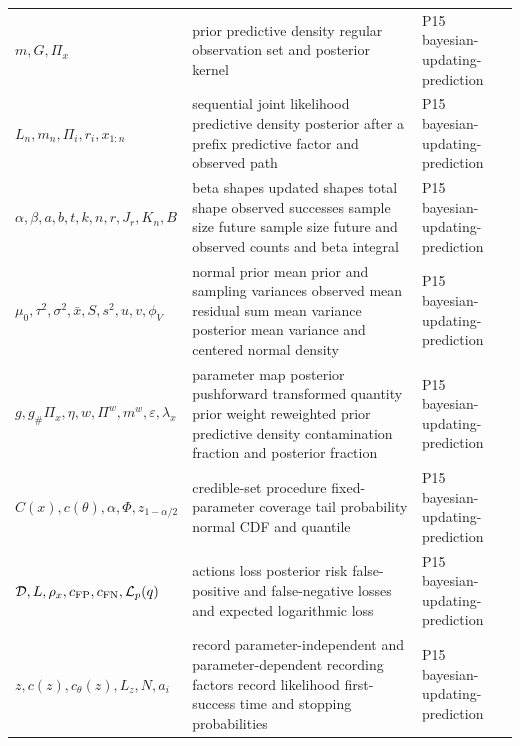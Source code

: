\begin{longtable}{@{}p{}p{}p{}@{}}
\(m,\allowbreak G,\allowbreak \Pi_x\) & prior predictive density regular observation set and posterior kernel & P15 bayesian-\allowbreak{}updating-\allowbreak{}prediction \\
\(L_n,\allowbreak m_n,\allowbreak \Pi_i,\allowbreak r_i,\allowbreak x_{1:n}\) & sequential joint likelihood predictive density posterior after a prefix predictive factor and observed path & P15 bayesian-\allowbreak{}updating-\allowbreak{}prediction \\
\(\alpha,\allowbreak \beta,\allowbreak a,\allowbreak b,\allowbreak t,\allowbreak k,\allowbreak n,\allowbreak r,\allowbreak J_r,\allowbreak K_n,\allowbreak B\) & beta shapes updated shapes total shape observed successes sample size future sample size future and observed counts and beta integral & P15 bayesian-\allowbreak{}updating-\allowbreak{}prediction \\
\(\mu_0,\allowbreak \tau^2,\allowbreak \sigma^2,\allowbreak \bar x,\allowbreak S,\allowbreak s^2,\allowbreak u,\allowbreak v,\allowbreak \phi_V\) & normal prior mean prior and sampling variances observed mean residual sum mean variance posterior mean variance and centered normal density & P15 bayesian-\allowbreak{}updating-\allowbreak{}prediction \\
\(g,\allowbreak g_\#\Pi_x,\allowbreak \eta,\allowbreak w,\allowbreak \Pi^w,\allowbreak m^w,\allowbreak \varepsilon,\allowbreak \lambda_x\) & parameter map posterior pushforward transformed quantity prior weight reweighted prior predictive density contamination fraction and posterior fraction & P15 bayesian-\allowbreak{}updating-\allowbreak{}prediction \\
\(C(x),\allowbreak c(\theta),\allowbreak \alpha,\allowbreak \Phi,\allowbreak z_{1-\alpha/2}\) & credible-set procedure fixed-parameter coverage tail probability normal CDF and quantile & P15 bayesian-\allowbreak{}updating-\allowbreak{}prediction \\
\(\mathcal D,\allowbreak L,\allowbreak \rho_x,\allowbreak c_{\rm FP},\allowbreak c_{\rm FN},\allowbreak \mathcal L_p(q)\) & actions loss posterior risk false-positive and false-negative losses and expected logarithmic loss & P15 bayesian-\allowbreak{}updating-\allowbreak{}prediction \\
\(z,\allowbreak c(z),\allowbreak c_\theta(z),\allowbreak L_z,\allowbreak N,\allowbreak a_i\) & record parameter-independent and parameter-dependent recording factors record likelihood first-success time and stopping probabilities & P15 bayesian-\allowbreak{}updating-\allowbreak{}prediction \\

\end{longtable}
